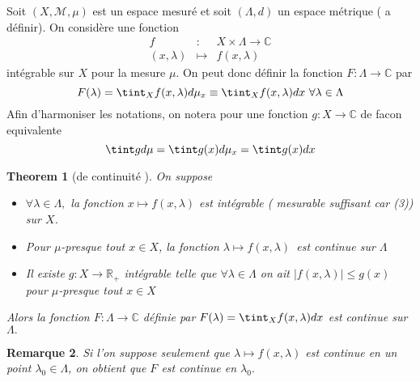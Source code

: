 \documentclass[3pt]{article}
\newtheorem{theorem}{Theorem}
\newtheorem{remark}[theorem]{Remarque}
\begin{document}
Soit $(X,\mathcal{M},\mu )$ est un espace mesur\'{e} et soit $(\Lambda ,d)$
un espace m\'{e}trique ( a d\'{e}finir). On consid\`{e}re une fonction 
\begin{eqnarray*}
f &:&X\times \Lambda \rightarrow \mathbb{C} \\
(x,\lambda ) &\longmapsto &f(x,\lambda )
\end{eqnarray*}%
int\'{e}grable sur $X$ pour la mesure $\mu .$ On peut donc d\'{e}finir la
fonction $F:\Lambda \rightarrow \mathbb{C}$ par%
\begin{equation*}
F(\lambda )=\tint_{X}f(x,\lambda )d\mu _{x}\equiv \tint_{X}f(x,\lambda )dx%
\text{ }\forall \lambda \in \Lambda
\end{equation*}%
Afin d'harmoniser les notations, on notera pour une fonction $g:X\rightarrow 
\mathbb{C}$ de facon equivalente 
\begin{equation*}
\tint gd\mu =\tint g(x)d\mu _{x}=\tint g(x)dx
\end{equation*}

\bigskip

\begin{theorem}[de continuit\'{e} ]
On suppose

\begin{itemize}
\item $\forall \lambda \in \Lambda ,$ la fonction $x\longmapsto f(x,\lambda
) $ est int\'{e}grable ( mesurable suffisant car (3)) sur $X$.

\item Pour $\mu $-presque tout $x\in X$, la fonction $\lambda \longmapsto
f(x,\lambda )$\ est continue sur $\Lambda $

\item Il existe $g:X\rightarrow \mathbb{R}_{+}$ int\'{e}grable telle que $%
\forall \lambda \in \Lambda $ on ait $\left\vert f(x,\lambda )\right\vert
\leq g(x)$ pour $\mu $-presque tout $x\in X$
\end{itemize}

Alors la fonction $F:\Lambda \rightarrow \mathbb{C}$ d\'{e}finie par $%
F(\lambda )=\tint_{X}f(x,\lambda )dx$ est continue sur $\Lambda .$
\end{theorem}

\bigskip

\begin{remark}
Si l'on suppose seulement que $\lambda \longmapsto f(x,\lambda )$ est
continue en un point $\lambda _{0}\in \Lambda $, on obtient que $F$ est
continue en $\lambda _{0}.$
\end{remark}
\end{document}
